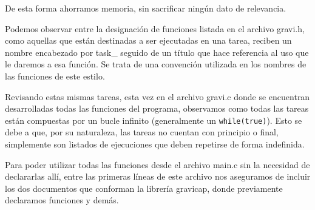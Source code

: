                     De esta forma ahorramos memoria, sin sacrificar ningún dato de relevancia.\par
                    Podemos observar entre la designación de funciones listada en el archivo gravi.h, como aquellas que están destinadas a ser ejecutadas en una tarea, reciben un nombre encabezado por task\_ seguido de un título que hace referencia al uso que le daremos a esa función. Se trata de una convención utilizada en los nombres de las funciones de este estilo.\par
                    Revisando estas mismas tareas, esta vez en el archivo gravi.c donde se encuentran desarrolladas todas las funciones del programa, observamos como todas las tareas están compuestas por un bucle infinito (generalmente un \texttt{while(true)}). Esto se debe a que, por su naturaleza, las tareas no cuentan con principio o final, simplemente son listados de ejecuciones que deben repetirse de forma indefinida.\par
                    Para poder utilizar todas las funciones desde el archivo main.c sin la necesidad de declararlas allí, entre las primeras líneas de este archivo nos aseguramos de incluir los dos documentos que conforman la librería gravicap, donde previamente declaramos funciones y demás.\par
                    \par
                
